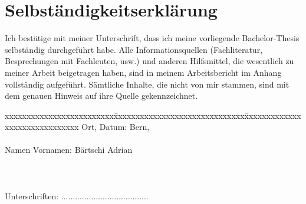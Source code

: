 \chapter*{Selbständigkeitserklärung}
\label{chap:selbstaendigkeitserklaerung}

\vspace*{10mm} 

Ich bestätige mit meiner Unterschrift, dass ich meine vorliegende Bachelor-Thesis selbständig durchgeführt habe. Alle Informationsquellen (Fachliteratur, Besprechungen mit Fachleuten, usw.) und anderen Hilfsmittel, die wesentlich zu meiner Arbeit beigetragen haben, sind in meinem Arbeitsbericht im Anhang vollständig aufgeführt. Sämtliche Inhalte, die nicht von mir stammen, sind mit dem genauen Hinweis auf ihre Quelle gekennzeichnet. 

\vspace{15mm}

\begin{tabbing}
xxxxxxxxxxxxxxxxxxxxxxxxx\=xxxxxxxxxxxxxxxxxxxxxxxxxxxxxx\=xxxxxxxxxxxxxxxxxxxxxxxxxxxxxx\kill
Ort, Datum:		\> Bern, \versiondate \\ \\ 
Namen Vornamen:	\> Bärtschi Adrian 	\\ \\ \\ \\ 
Unterschriften:	\> ......................................\> 
\end{tabbing}